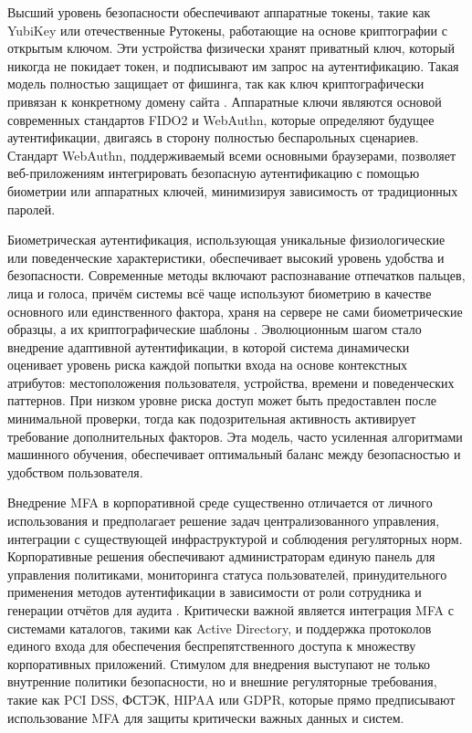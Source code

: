 \documentclass{SibFU-docs}
\begin{document}
Высший уровень безопасности обеспечивают аппаратные токены, такие как YubiKey или отечественные Рутокены, работающие на основе криптографии с открытым ключом. Эти устройства физически хранят приватный ключ, который никогда не покидает токен, и подписывают им запрос на аутентификацию. Такая модель полностью защищает от фишинга, так как ключ криптографически привязан к конкретному домену сайта \cite{yandex_cloud_2fa}. Аппаратные ключи являются основой современных стандартов FIDO2 и WebAuthn, которые определяют будущее аутентификации, двигаясь в сторону полностью беспарольных сценариев. Стандарт WebAuthn, поддерживаемый всеми основными браузерами, позволяет веб-приложениям интегрировать безопасную аутентификацию с помощью биометрии или аппаратных ключей, минимизируя зависимость от традиционных паролей.


Биометрическая аутентификация, использующая уникальные физиологические или поведенческие характеристики, обеспечивает высокий уровень удобства и безопасности. Современные методы включают распознавание отпечатков пальцев, лица и голоса, причём системы всё чаще используют биометрию в качестве основного или единственного фактора, храня на сервере не сами биометрические образцы, а их криптографические шаблоны \cite{anti_malware_mfa_2025}. Эволюционным шагом стало внедрение адаптивной аутентификации, в которой система динамически оценивает уровень риска каждой попытки входа на основе контекстных атрибутов: местоположения пользователя, устройства, времени и поведенческих паттернов. При низком уровне риска доступ может быть предоставлен после минимальной проверки, тогда как подозрительная активность активирует требование дополнительных факторов. Эта модель, часто усиленная алгоритмами машинного обучения, обеспечивает оптимальный баланс между безопасностью и удобством пользователя.


Внедрение MFA в корпоративной среде существенно отличается от личного использования и предполагает решение задач централизованного управления, интеграции с существующей инфраструктурой и соблюдения регуляторных норм. Корпоративные решения обеспечивают администраторам единую панель для управления политиками, мониторинга статуса пользователей, принудительного применения методов аутентификации в зависимости от роли сотрудника и генерации отчётов для аудита \cite{itglobal_mfa_corporate}. Критически важной является интеграция MFA с системами каталогов, такими как Active Directory, и поддержка протоколов единого входа для обеспечения беспрепятственного доступа к множеству корпоративных приложений. Стимулом для внедрения выступают не только внутренние политики безопасности, но и внешние регуляторные требования, такие как PCI DSS, ФСТЭК, HIPAA или GDPR, которые прямо предписывают использование MFA для защиты критически важных данных и систем.
\end{document}
